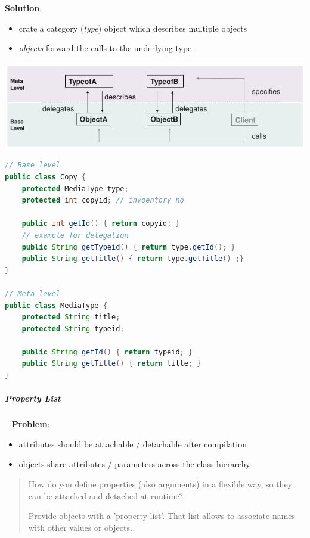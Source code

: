 \documentclass[11pt,twoside,landscape]{article}
\begin{document}
\begin{multicols}{3}
\textbf{Solution}:
\begin{itemize}
\item crate a category (\emph{type}) object which describes multiple objects
\item \emph{objects} forward the calls to the underlying type
\end{itemize}


{
\begin{center}
\includegraphics[width=.9\linewidth]{img/type_object_meta_base_level.png}
\end{center}
\label{fig:meta-base-level-interactions}
}

\begin{lstlisting}[language=java,label=lst:example-for-type-object,caption={Example for Type Object},captionpos=b,numbers=none]
// Base level
public class Copy {
    protected MediaType type;
    protected int copyid; // invoentory no

    public int getId() { return copyid; }
    // example for delegation
    public String getTypeid() { return type.getId(); }
    public String getTitle() { return type.getTitle() ;}
}

// Meta level
public class MediaType {
    protected String title;
    protected String typeid;

    public String getId() { return typeid; }
    public String getTitle() { return title; }
}
\end{lstlisting}
\subparagraph{Property List} \
\label{sec:org51a68ec}
\textbf{Problem}:
\begin{itemize}
\item attributes should be attachable / detachable after compilation
\item objects share attributes / parameters across the class hierarchy
\end{itemize}


\begin{quote}
How do you define properties (also arguments) in a flexible way, so they can be attached and detached at runtime?

Provide objects with a 'property list'. That list allows to associate names with other values or objects.
\end{quote}



\end{multicols}
\end{document}
